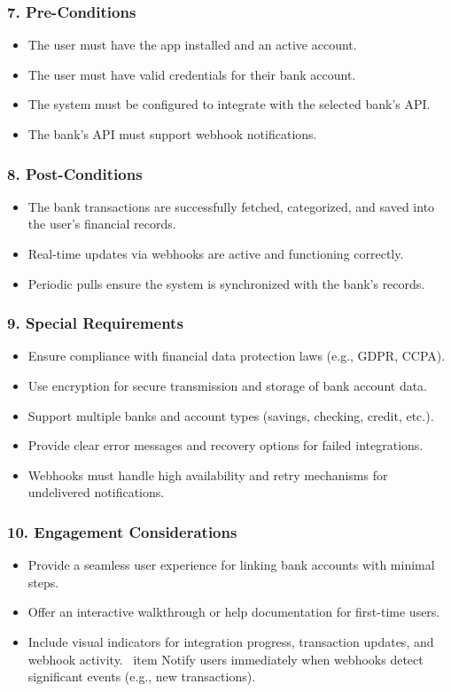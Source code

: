 \subsubsection*{7. Pre-Conditions}
\begin{itemize}
    \item The user must have the app installed and an active account.
    \item The user must have valid credentials for their bank account.
    \item The system must be configured to integrate with the selected bank’s API.
    \item The bank's API must support webhook notifications.
\end{itemize}

\subsubsection*{8. Post-Conditions}
\begin{itemize}
    \item The bank transactions are successfully fetched, categorized, and saved into the user's financial records.
    \item Real-time updates via webhooks are active and functioning correctly.
    \item Periodic pulls ensure the system is synchronized with the bank's records.
\end{itemize}

\subsubsection*{9. Special Requirements}
\begin{itemize}
    \item Ensure compliance with financial data protection laws (e.g., GDPR, CCPA).
    \item Use encryption for secure transmission and storage of bank account data.
    \item Support multiple banks and account types (savings, checking, credit, etc.).
    \item Provide clear error messages and recovery options for failed integrations.
    \item Webhooks must handle high availability and retry mechanisms for undelivered notifications.
\end{itemize}

\subsubsection*{10. Engagement Considerations}
\begin{itemize}
    \item Provide a seamless user experience for linking bank accounts with minimal steps.
    \item Offer an interactive walkthrough or help documentation for first-time users.
    \item Include visual indicators for integration progress, transaction updates, and webhook activity.
\    item Notify users immediately when webhooks detect significant events (e.g., new transactions).
\end{itemize}

